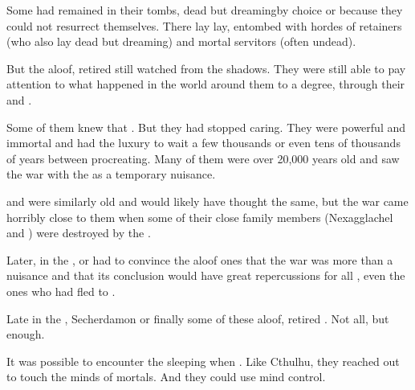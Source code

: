 Some had remained in their tombs, dead but dreaming\dash by choice or because they could not resurrect themselves. 
There lay lay, entombed with hordes of \ophidian retainers (who also lay dead but dreaming) and mortal servitors (often undead). 

But the aloof, retired \dragons still watched \Miith from the shadows.
They were still able to pay attention to what happened in the world around them to a degree, through their \daemons and \homunculi.



Some of them knew that .
But they had stopped caring. 
They were powerful and immortal and had the luxury to wait a few thousands or even tens of thousands of years between procreating. 
Many of them were over 20,000 years old and saw the war with the \resphain as a temporary nuisance. 

\Ishnaruchaefir and \Secherdamon were similarly old and would likely have thought the same, but the war came horribly close to them when some of their close family members (Nexagglachel and ) were destroyed by the \resphain.

Later, in the \thirdbanewar, \Secherdamon or \Ishnaruchaefir had to convince the aloof ones that the war was more than a nuisance and that its conclusion would have great repercussions for all \dragons, even the ones who had fled to \Machai.

Late in the \thirdbanewar, Secherdamon or \Ishnaruchaefir finally  some of these aloof, retired \dragons.
Not all, but enough.

It was possible to encounter the sleeping \dragons when .
Like Cthulhu, they reached out to touch the minds of mortals.
And they could use mind control.





